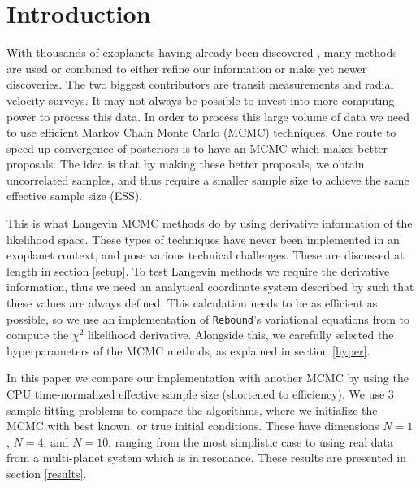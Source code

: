 \documentclass{aa}
\begin{document}

   \maketitle
%
\section{Introduction}
With thousands of exoplanets having already been discovered \citep{exoArchive}, many methods are used or combined to either refine our information or make yet newer discoveries. The two biggest contributors are transit measurements and radial velocity surveys. It may not always be possible to invest into more computing power to process this data. In order to process this large volume of data we need to use efficient Markov Chain Monte Carlo (MCMC) techniques. One route to speed up convergence of posteriors is to have an MCMC which makes better proposals. The idea is that by making these better proposals, we obtain uncorrelated samples, and thus require a smaller sample size to achieve the same effective sample size (ESS).

This is what Langevin MCMC methods do by using derivative information of the likelihood space. These types of techniques have never been implemented in an exoplanet context, and pose various technical challenges. These are discussed at length in section \ref{setup}. To test Langevin methods we require the derivative information, thus we need an analytical coordinate system described by \cite{Pl2009} such that these values are always defined. This calculation needs to be as efficient as possible, so we use an implementation of \texttt{Rebound}'s variational equations from \cite{Rein2016} to compute the $\chi^2$ likelihood derivative. Alongside this, we carefully selected the hyperparameters of the MCMC methods, as explained in section \ref{hyper}.

In this paper we compare our implementation with another MCMC by using the CPU time-normalized effective sample size (shortened to efficiency). We use 3 sample fitting problems to compare the algorithms, where we initialize the MCMC with best known, or true initial conditions. These have dimensions $N=1$, $N=4$, and $N=10$, ranging from the most simplistic case to using real data from a multi-planet system which is in resonance. These results are presented in section \ref{results}.
 
\end{document}
